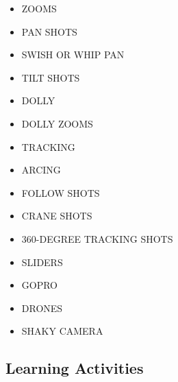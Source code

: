 \documentclass[
]{book}
\providecommand{\tightlist}{%
  \setlength{\itemsep}{0pt}\setlength{\parskip}{0pt}}
\begin{document}
\begin{itemize}
\tightlist
\item
  ZOOMS\\
\item
  PAN SHOTS\\
\item
  SWISH OR WHIP PAN\\
\item
  TILT SHOTS\\
\item
  DOLLY\\
\item
  DOLLY ZOOMS\\
\item
  TRACKING\\
\item
  ARCING\\
\item
  FOLLOW SHOTS\\
\item
  CRANE SHOTS\\
\item
  360-DEGREE TRACKING SHOTS\\
\item
  SLIDERS\\
\item
  GOPRO\\
\item
  DRONES\\
\item
  SHAKY CAMERA
\end{itemize}

\hypertarget{learning-activities-5}{%
\subsection*{Learning Activities}\label{learning-activities-5}}
\end{document}
